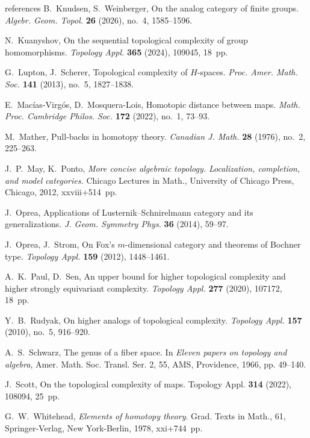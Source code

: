 \documentclass[amscd,amssymb,verbatim,10pt]{amsart}
\numberwithin{equation}{section}
\theoremstyle{plain}
\theoremstyle{definition}
\begin{document}
\begin{thebibliography}{references}
 B.~Knudsen, S.~Weinberger, On the analog category of finite groups. \emph{Algebr. Geom. Topol.} \textbf{26} (2026), no.~4, 1585--1596.

 N.~Kuanyshov, On the sequential topological complexity of group homomorphisms. \emph{Topology Appl.} \textbf{365} (2024), 109045, 18~pp.

 G.~Lupton, J.~Scherer, Topological complexity of $H$-spaces. \emph{Proc. Amer. Math. Soc.} \textbf{141} (2013), no.~5, 1827--1838.

 E.~Mac\'ias-Virg\'os, D.~Mosquera-Lois, Homotopic distance between maps. \emph{Math. Proc. Cambridge Philos. Soc.} \textbf{172} (2022), no.~1, 73--93.

 M.~Mather, Pull-backs in homotopy theory. \emph{Canadian J. Math.} \textbf{28} (1976), no.~2, 225--263.

 J.~P.~May, K.~Ponto, \emph{More concise algebraic topology. Localization, completion, and model categories.} Chicago Lectures in Math., University of Chicago Press, Chicago, 2012, xxviii+514~pp.

 J.~Oprea, Applications of Lusternik--Schnirelmann category and its generalizations. \emph{J. Geom. Symmetry Phys.} \textbf{36} (2014), 59--97.

 J.~Oprea, J.~Strom, On Fox's $m$-dimensional category and theorems of Bochner type. \emph{Topology Appl.} \textbf{159} (2012), 1448--1461.

 A.~K.~Paul, D.~Sen, An upper bound for higher topological complexity and higher strongly equivariant complexity. \emph{Topology Appl.} \textbf{277} (2020), 107172, 18~pp.

 Y.~B.~Rudyak, On higher analogs of topological complexity. \emph{Topology Appl.} \textbf{157} (2010), no.~5, 916--920.

 A.~S.~Schwarz, The genus of a fiber space. In \emph{Eleven papers on topology and algebra}, Amer. Math. Soc. Transl. Ser. 2, 55, AMS, Providence, 1966, pp. 49--140.

 J.~Scott, On the topological complexity of maps. Topology Appl. \textbf{314} (2022), 108094, 25~pp.

 G.~W.~Whitehead, \emph{Elements of homotopy theory}. Grad. Texts in Math., 61, Springer-Verlag, New York-Berlin, 1978, xxi+744~pp.
\end{thebibliography}
\end{document}
